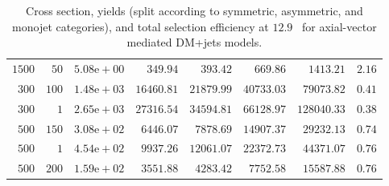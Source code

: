 \begin{table}
{\begin{tabular}{rrlrrrrr}
    $1500$ & $50$  & $5.08\text{e}+00$ & $349.94$   & $393.42$   & $669.86$   & $1413.21$   & $2.16$ \\
    $300$  & $100$ & $1.48\text{e}+03$ & $16460.81$ & $21879.99$ & $40733.03$ & $79073.82$  & $0.41$ \\
    $300$  & $1$   & $2.65\text{e}+03$ & $27316.54$ & $34594.81$ & $66128.97$ & $128040.33$ & $0.38$ \\
    $500$  & $150$ & $3.08\text{e}+02$ & $6446.07$  & $7878.69$  & $14907.37$ & $29232.13$  & $0.74$ \\
    $500$  & $1$   & $4.54\text{e}+02$ & $9937.26$  & $12061.07$ & $22372.73$ & $44371.07$  & $0.76$ \\
    $500$  & $200$ & $1.59\text{e}+02$ & $3551.88$  & $4283.42$  & $7752.58$  & $15587.88$  & $0.76$ \\
    \hline\hline
    \end{tabular}
    }
    \caption{Cross section, yields (split according to symmetric, asymmetric, 
        and monojet categories), and total selection efficiency at $12.9$~\ifb 
        for axial-vector mediated DM+jets models.}
    \label{tab:DMAV_yld}
\end{table}

